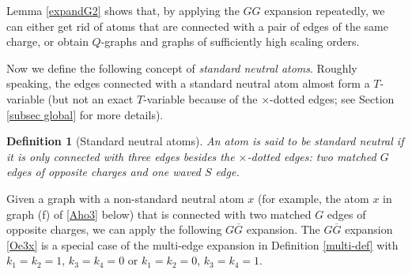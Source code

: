 \documentclass{article}
\newcommand{\1}{\mathds{1}}
\numberwithin{equation}{section}
\theoremstyle{plain} %
\newtheorem{definition}[theorem]{Definition}
\theoremstyle{remark}
\newcommand{\cor}{\color{red}}
\newcommand{\hty}[1]{{\cor (ht: #1) }}
\begin{document}
Lemma \ref{expandG2} shows that, by applying the $GG$ expansion repeatedly, we can either get rid of atoms %
that are connected with a pair of edges of the same charge, or obtain $Q$-graphs and graphs of sufficiently high scaling orders. 

%
%

Now we define the following concept of \emph{standard neutral atoms}. Roughly speaking, the edges connected with a standard neutral atom almost form a $T$-variable (but not an exact $T$-variable because of the $\times$-dotted edges; see Section \ref{subsec global} for more details).


 \begin{definition}[{Standard neutral atoms}]\label{def SNA}
An atom is said to be \emph{standard neutral} if it is only connected with three edges besides the $\times$-dotted edges: two {matched} $G$ edges of {opposite charges} and one waved $S$ edge. 
 \end{definition}
 
Given a graph with a non-standard neutral atom $x$ (for example, the atom $x$ in graph (f) of \eqref{Aho3} below) that is connected with two matched $G$ edges of opposite charges, we can apply the following $G\overline G$ expansion. The $G\overline G$ expansion \eqref{Oe3x} is a special case of the multi-edge expansion in Definition \ref{multi-def} with $k_1=k_2=1$, $k_3=k_4=0$ or $k_1=k_2=0$, $k_3=k_4=1$.
\end{document}
